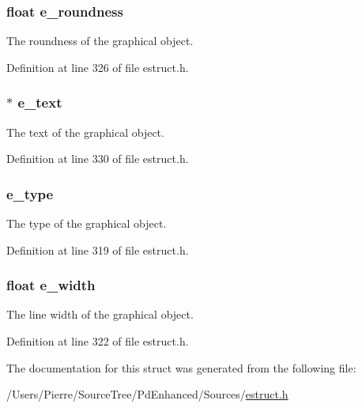 \hypertarget{struct__egobj_ab2c5a6f93a125c4862295e28aad05a74}{
\subsubsection[{e\-\_\-roundness}]{\setlength{\rightskip}{0pt plus 5cm}float e\-\_\-roundness}}\label{struct__egobj_ab2c5a6f93a125c4862295e28aad05a74}
The roundness of the graphical object. 

Definition at line 326 of file estruct.\-h.

\hypertarget{struct__egobj_a5f97b246c0da885ff0cd44b32a967338}{
\subsubsection[{e\-\_\-text}]{$\ast$ e\-\_\-text}}\label{struct__egobj_a5f97b246c0da885ff0cd44b32a967338}
The text of the graphical object. 

Definition at line 330 of file estruct.\-h.

\hypertarget{struct__egobj_a8083c24bd4930af629d483d7bf45a20a}{
\subsubsection[{e\-\_\-type}]{ e\-\_\-type}}\label{struct__egobj_a8083c24bd4930af629d483d7bf45a20a}
The type of the graphical object. 

Definition at line 319 of file estruct.\-h.

\hypertarget{struct__egobj_abe0dac7e3167ea1dd6c4e238ab4ab8bd}{
\subsubsection[{e\-\_\-width}]{\setlength{\rightskip}{0pt plus 5cm}float e\-\_\-width}}\label{struct__egobj_abe0dac7e3167ea1dd6c4e238ab4ab8bd}
The line width of the graphical object. 

Definition at line 322 of file estruct.\-h.



The documentation for this struct was generated from the following file\-:\begin{DoxyCompactItemize}
\item 
/\-Users/\-Pierre/\-Source\-Tree/\-Pd\-Enhanced/\-Sources/\hyperlink{estruct_8h}{estruct.\-h}\end{DoxyCompactItemize}
